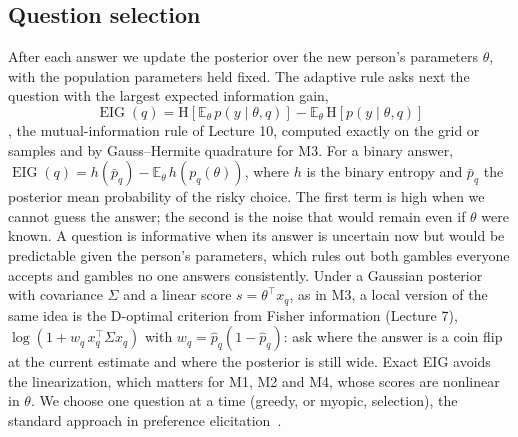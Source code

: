 \documentclass{article}
\newcommand{\EIG}{\operatorname{EIG}}
\begin{document}
\subsection{Question selection}
After each answer we update the posterior over the new person's parameters $\theta$, with the population parameters held fixed. The adaptive rule asks next the question with the largest expected information gain,
\begin{equation}
  \EIG(q) = \mathrm{H}\!\left[\mathbb{E}_{\theta}\, p(y \mid \theta, q)\right] - \mathbb{E}_{\theta}\, \mathrm{H}\!\left[p(y \mid \theta, q)\right]
\end{equation}
\citep{houlsby2011}, the mutual-information rule of Lecture 10, computed exactly on the grid or samples and by Gauss--Hermite quadrature for M3. For a binary answer, $\EIG(q) = h(\bar p_q) - \mathbb{E}_\theta\, h(p_q(\theta))$, where $h$ is the binary entropy and $\bar p_q$ the posterior mean probability of the risky choice. The first term is high when we cannot guess the answer; the second is the noise that would remain even if $\theta$ were known. A question is informative when its answer is uncertain now but would be predictable given the person's parameters, which rules out both gambles everyone accepts and gambles no one answers consistently. Under a Gaussian posterior with covariance $\Sigma$ and a linear score $s = \theta^\top x_q$, as in M3, a local version of the same idea is the D-optimal criterion from Fisher information (Lecture 7), $\log(1 + w_q\, x_q^\top \Sigma x_q)$ with $w_q = \hat p_q(1 - \hat p_q)$: ask where the answer is a coin flip at the current estimate and where the posterior is still wide. Exact EIG avoids the linearization, which matters for M1, M2 and M4, whose scores are nonlinear in $\theta$. We choose one question at a time (greedy, or myopic, selection), the standard approach in preference elicitation~\citep{chapman2018dose}.
\end{document}
